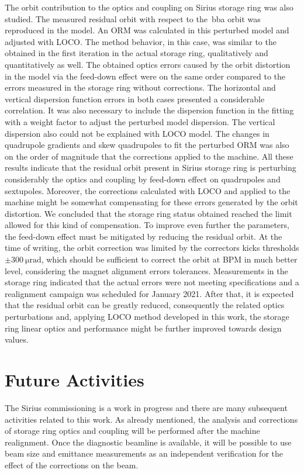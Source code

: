 The orbit contribution to the optics and coupling on Sirius storage ring was also studied. The measured residual orbit with respect to the~\gls{bba} orbit was reproduced in the model. An ORM was calculated in this perturbed model and adjusted with LOCO. The method behavior, in this case, was similar to the obtained in the first iteration in the actual storage ring, qualitatively and quantitatively as well. The obtained optics errors caused by the orbit distortion in the model via the feed-down effect were on the same order compared to the errors measured in the storage ring without corrections. The horizontal and vertical dispersion function errors in both cases presented a considerable correlation. It was also necessary to include the dispersion function in the fitting with a weight factor to adjust the perturbed model dispersion. The vertical dispersion also could not be explained with LOCO model. The changes in quadrupole gradients and skew quadrupoles to fit the perturbed ORM was also on the order of magnitude that the corrections applied to the machine. All these results indicate that the residual orbit present in Sirius storage ring is perturbing considerably the optics and coupling by feed-down effect on quadrupoles and sextupoles. Moreover, the corrections calculated with LOCO and applied to the machine might be somewhat compensating for these errors generated by the orbit distortion. We concluded that the storage ring status obtained reached the limit allowed for this kind of compensation. To improve even further the parameters, the feed-down effect must be mitigated by reducing the residual orbit. At the time of writing, the orbit correction was limited by the correctors kicks thresholds $\pm\SI{300}{\micro\radian}$, which should be sufficient to correct the orbit at BPM in much better level, considering the magnet alignment errors tolerances. Measurements in the storage ring indicated that the actual errors were not meeting specifications and a realignment campaign was scheduled for January 2021. After that, it is expected that the residual orbit can be greatly reduced, consequently the related optics perturbations and, applying LOCO method developed in this work, the storage ring linear optics and performance might be further improved towards design values. 
\section*{Future Activities}
The Sirius commissioning is a work in progress and there are many subsequent activities related to this work. As already mentioned, the analysis and corrections of storage ring optics and coupling will be performed after the machine realignment. Once the diagnostic beamline is available, it will be possible to use beam size and emittance measurements as an independent verification for the effect of the corrections on the beam. 

